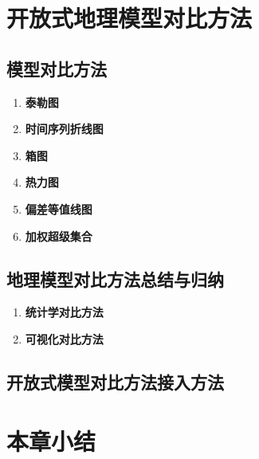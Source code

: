 \section{开放式地理模型对比方法}
\subsection{模型对比方法}
\begin{enumerate}[(1)]
\item \textbf{泰勒图}

\item \textbf{时间序列折线图}

\item \textbf{箱图}

\item \textbf{热力图}

\item \textbf{偏差等值线图}

\item \textbf{加权超级集合}

\end{enumerate}

\subsection{地理模型对比方法总结与归纳}
\begin{enumerate}[(1)]
\item \textbf{统计学对比方法}

\item \textbf{可视化对比方法}
\end{enumerate}

\subsection{开放式模型对比方法接入方法}

\section{本章小结}
